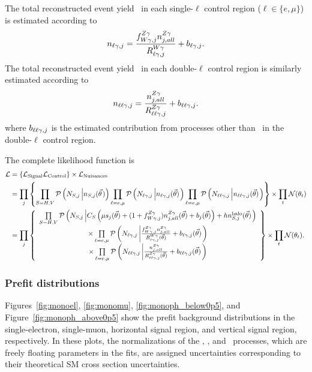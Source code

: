 The total reconstructed event yield \nl\ in each single-$\ell$ control region ($\ell \in \{e,\mu\}$) is estimated according to
\begin{equation}
  \nl[,j] = \frac{\fZW[,j]\nZg[j,all]}{\RWl[,j]} + b_{\ell\Pgamma,j}.
\end{equation}
The total reconstructed event yield \nll\ in each double-$\ell$ control region is similarly estimated according to
\begin{equation}
  \nll[,j] = \frac{\nZg[j,all]}{\RZll[,j]} + b_{\ell\ell\Pgamma,j}.
\end{equation}
where $b_{\ell\ell\Pgamma,j}$ is the estimated contribution from processes other than \zllg\ in the double-$\ell$ control region.

The complete likelihood function is
\begin{align}
  \mathcal{L} & = \left\{ \mathcal{L_{\text{Signal}}} \mathcal{L_{\text{Control}}} \right\} \times \mathcal{L_{\text{Nuisances}}} \\
  & = \prod_{j} \left\{
    \prod_{S=H,V} \mathcal{P}\left( N_{S, j} \left| \nS[,j] (\vec{\theta} \right.) \right)
     \prod_{\ell=\Pe,\Pmu} \mathcal{P}\left( N_{\ell\Pgamma, j} \left| \nl[,j] (\vec{\theta}) \right. \right)
      \prod_{\ell=\Pe,\Pmu} \mathcal{P}\left( N_{\ell\ell\Pgamma, j} \left| \nll[,j] (\vec{\theta}) \right. \right) 
    \right\}  \times \prod_{t} \mathcal{N}(\theta_t) \\
  & = \prod_{j} \left\{
  \begin{array}{cc}
    \prod\limits_{S=H,V} \mathcal{P}\left( N_{S, j} \left| C_{S} \left(\mu s_{j}(\vec{\theta}) + (1 + \fZW[,j])\nZg[j,all](\vec{\theta}) + b_{j}(\vec{\theta})\right) + h \nhalo[,j](\vec{\theta}) \right. \right) \\[1.3pt]
    \times \prod\limits_{\ell=\Pe,\Pmu} \mathcal{P}\left( N_{\ell\Pgamma, j} \left| \frac{\fZW[,j]\nZg[j,all]}{\RWl[,j](\vec{\theta})} + b_{\ell\Pgamma, j}(\vec{\theta}) \right. \right) \\[1.3pt]
    \times \prod\limits_{\ell=\Pe,\Pmu} \mathcal{P}\left( N_{\ell\ell\Pgamma, j} \left| \frac{\nZg[j,all]}{\RZll[,j](\vec{\theta})} + b_{\ell\ell\Pgamma, j}(\vec{\theta}) \right. \right) \\[1.3pt]
  \end{array} \right\}
  \times \prod_{t} \mathcal{N}(\theta_t).
\end{align}

\subsubsection{Prefit distributions}
Figures~\ref{fig:monoel}, \ref{fig:monomu}, \ref{fig:monoph_below0p5}, and Figure~\ref{fig:monoph_above0p5} show the prefit
background distributions in the single-electron, single-muon, horizontal signal region, and vertical signal region, respectively.
In these plots, the normalizations of the \zinvg, \wlng, and \zllg\ processes,
which are freely floating parameters in the fits, are assigned uncertainties corresponding to their theoretical SM cross section uncertainties.

